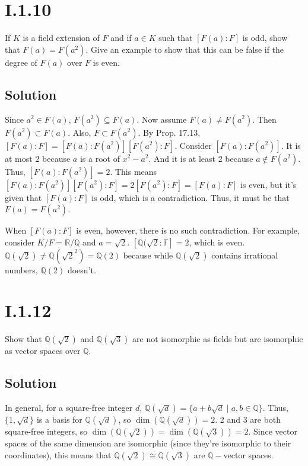 \documentclass[fleqn]{article}
\begin{document}
    \section{I.1.10}
    If $K$ is a field extension of $F$ and if $a \in K$ such that $[F(a) : F]$ is odd, show that $F(a) = F(a^2)$.  Give an example to show that this can be false if the degree of $F(a)$ over $F$ is even.
        
        \subsection{Solution}
        Since $a^2 \in F(a)$, $F(a^2) \subseteq F(a)$.  Now assume $F(a) \neq F(a^2)$.  Then $F(a^2) \subset F(a)$.  Also, $F \subset F(a^2)$.  By Prop. 17.13, $[F(a) : F] = [F(a) : F(a^2)] [F(a^2) : F]$.  Consider $[F(a) : F(a^2)]$.  It is at most 2 because $a$ is a root of $x^2 - a^2$.  And it is at least 2 because $a \notin F(a^2)$.  Thus, $[F(a) : F(a^2)] = 2$.  This means $[F(a) : F(a^2)] [F(a^2) : F] = 2[F(a^2) : F] = [F(a) : F]$ is even, but it's given that $[F(a) : F]$ is odd, which is a contradiction.  Thus, it must be that $F(a) = F(a^2)$.
        
        When $[F(a) : F]$ is even, however, there is no such contradiction.  For example, consider $K/F = \mathbb{R}/\mathbb{Q}$ and $a = \sqrt{2}$.  $[\mathbb{Q}(\sqrt{2} : \mathbb{F}] = 2$, which is even.  $\mathbb{Q}(\sqrt{2}) \neq \mathbb{Q}(\sqrt{2}^2) = \mathbb{Q}(2)$ because while $\mathbb{Q}(\sqrt{2})$ contains irrational numbers, $\mathbb{Q}(2)$ doesn't.
    
    \section{I.1.12}
    Show that $\mathbb{Q}(\sqrt{2})$ and $\mathbb{Q}(\sqrt{3})$ are not isomorphic as fields but are isomorphic as vector spaces over $\mathbb{Q}$.
        
        \subsection{Solution}
        In general, for a square-free integer $d$, $\mathbb{Q}(\sqrt{d}) = \{a + b\sqrt{d} \mid a, b \in \mathbb{Q}\}$.  Thus, $\{1, \sqrt{d}\}$ is a basis for $\mathbb{Q}(\sqrt{d})$, so $\dim(\mathbb{Q}(\sqrt{d})) = 2$.  2 and 3 are both square-free integers, so $\dim(\mathbb{Q}(\sqrt{2})) = \dim(\mathbb{Q}(\sqrt{3})) = 2$.  Since vector spaces of the same dimension are isomorphic (since they're isomorphic to their coordinates), this means that $\mathbb{Q}(\sqrt{2}) \cong \mathbb{Q}(\sqrt{3})$ are $\mathbb{Q}-$vector spaces.
        
\end{document}
